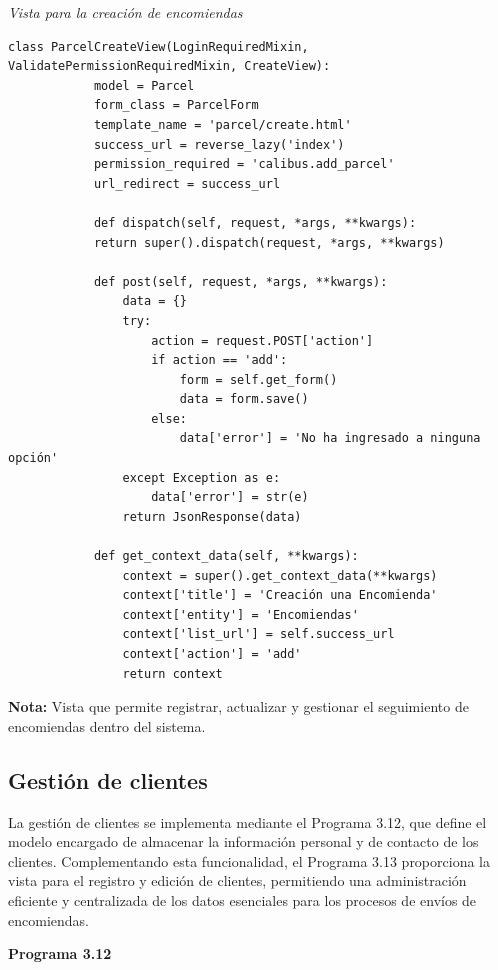 		\textit{Vista para la creación de encomiendas} %
		\vspace{0.3cm} %
		\begin{lstlisting}[lineskip=-1pt]
		class ParcelCreateView(LoginRequiredMixin, ValidatePermissionRequiredMixin, CreateView):
			model = Parcel
			form_class = ParcelForm
			template_name = 'parcel/create.html'
			success_url = reverse_lazy('index')
			permission_required = 'calibus.add_parcel'
			url_redirect = success_url
			
			def dispatch(self, request, *args, **kwargs):
			return super().dispatch(request, *args, **kwargs)
			
			def post(self, request, *args, **kwargs):
				data = {}
				try:
					action = request.POST['action']
					if action == 'add':
						form = self.get_form()
						data = form.save()
					else:
						data['error'] = 'No ha ingresado a ninguna opción'
				except Exception as e:
					data['error'] = str(e)
				return JsonResponse(data)
			
			def get_context_data(self, **kwargs):
				context = super().get_context_data(**kwargs)
				context['title'] = 'Creación una Encomienda'
				context['entity'] = 'Encomiendas'
				context['list_url'] = self.success_url
				context['action'] = 'add'
				return context
		\end{lstlisting}
		
		\textbf{Nota:} Vista que permite registrar, actualizar y gestionar el seguimiento de encomiendas dentro del sistema.
	
	\subsection{Gestión de clientes}
	
		La gestión de clientes se implementa mediante el Programa 3.12, que define el modelo encargado de almacenar la información personal y de contacto de los clientes.  Complementando esta funcionalidad, el Programa 3.13 proporciona la vista para el registro y edición de clientes, permitiendo una administración eficiente y centralizada de los datos esenciales para los procesos de envíos de encomiendas.
	
	\textbf{Programa 3.12}
	
